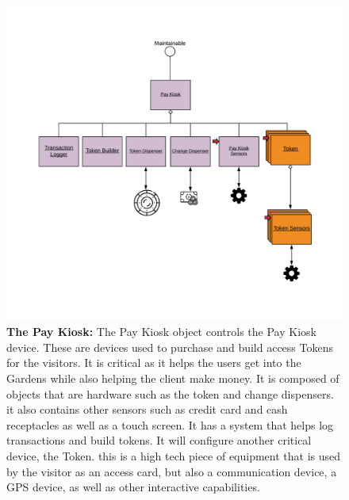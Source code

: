 \documentclass[12pt]{article}
\begin{document}
\begin{figure}[H]
    \centerline{\includegraphics[scale=.20]{PayKiosk.png}}
    \caption{\textbf{The Pay Kiosk: }The Pay Kiosk object controls the Pay Kiosk device. These are devices used to 
purchase and build access Tokens for the visitors. It is critical as it helps the users get into 
the Gardens while also helping the client make money. It is composed of objects that are hardware such
 as the token and change dispensers. it also contains other sensors such as credit card and cash 
 receptacles as well as a touch screen. It has a system that helps log transactions and build tokens. 
 It will configure another critical device, the Token. this is a high tech piece of equipment that is 
 used by the visitor as an access card, but also a communication device, a GPS device, as well as 
 other interactive capabilities.}
    \label{fig:PayKiosk}
\end{figure} 
\end{document}
